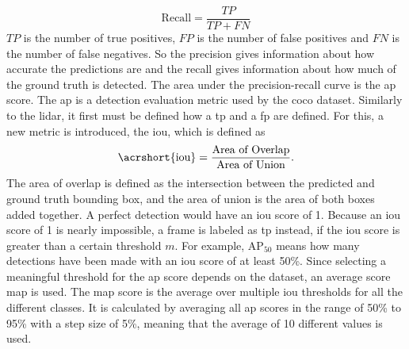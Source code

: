 \begin{equation}
	\text{Recall} = \frac{TP}{TP+FN}
\end{equation}
$TP$ is the number of true positives, $FP$ is the number of false positives and $FN$ is the number of false negatives.
So the precision gives information about how accurate the predictions are and the recall gives information about how much of the ground truth is detected.
The area under the precision-recall curve is the \gls{ap} score.
The \gls{ap} is a detection evaluation metric used by the \gls{coco} dataset.
Similarly to the \gls{lidar}, it first must be defined how a \gls{tp} and a \gls{fp} are defined.
For this, a new metric is introduced, the \gls{iou}, which is defined as
\begin{equation}
	\text{\acrshort{iou}} = \frac{\text{Area of Overlap}}{\text{Area of Union}}.
\end{equation}
The area of overlap is defined as the intersection between the predicted and ground truth bounding box, and the area of union is the area of both boxes added together.
A perfect detection would have an \gls{iou} score of 1.
Because an \gls{iou} score of 1 is nearly impossible, a frame is labeled as \gls{tp} instead, if the \gls{iou} score is greater than a certain threshold $m$.
For example, $\text{AP}_{50}$ means how many detections have been made with an \gls{iou} score of at least 50\%.
Since selecting a meaningful threshold for the \gls{ap} score depends on the dataset, an average score \gls{map} is used.
The \gls{map} score is the average over multiple \gls{iou} thresholds for all the different classes.
It is calculated by averaging all \gls{ap} scores in the range of 50\% to 95\% with a step size of 5\%, meaning that the average of 10 different values is used.\\


\section{}

